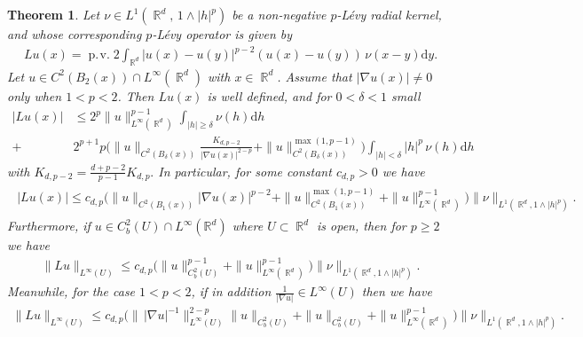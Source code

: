 \documentclass[10pt,a4paper]{amsart}
\newtheorem{theorem}{Theorem}
\DeclareMathOperator{\R}{\mathbb{R}}
\renewcommand{\d}{\mathrm{d}}
\DeclareMathOperator{\pv}{\operatorname{p.\!v.}}
\begin{document}
\begin{theorem}\label{thm:point-evalua-pLevy-rad}
Let $\nu \in L^1(\R^d,\, 1 \wedge |h|^p)$ be a non-negative $p$-L\'evy radial kernel, and whose corresponding $p$-L\'evy operator is given by
\begin{align*}
Lu(x)= \pv 2\int_{\R^d}|u(x)-u(y)|^{p-2}(u(x)-u(y))\, \nu(x-y)\d y.
\end{align*}
Let $u \in C^{2}(B_{2}(x)) \cap L^{\infty}(\R^d)$ with $x \in \R^d$. Assume that $|\nabla u(x)| \neq 0$ only when $1 < p < 2$.
Then $Lu(x)$ is well defined, and for  $0<\delta<1$ small
\begin{align*}
|Lu(x)|&\leq 2^p\|u\|^{p-1}_{L^\infty(\R^d)}\int_{|h|\geq \delta}\nu(h)\d h\\
+&2^{p+1}p\Big(\|u\|_{C^2(B_\delta(x))} \frac{K_{d,p-2}}{|\nabla u(x)|^{2-p}}+
\|u\|^{\max(1, p-1)}_{C^2(B_\delta(x))}\Big)\int_{|h|<\delta}|h|^p\, \nu(h)\d h
\end{align*}
with  $K_{d,p-2}= \tfrac{d+p-2}{p-1} K_{d,p}. $ In particular, for some constant $c_{d,p}>0$ we have
\begin{align*}
\begin{split}
|Lu(x)|\leq c_{d,p}\Big(\|u\|_{C^2(B_1(x))} |\nabla u(x)|^{p-2}+
\|u\|^{\max(1, p-1)}_{C^2(B_1(x))}+\|u\|^{p-1}_{L^\infty(\R^d)}\Big)
\|\nu\|_{L^1(\R^d,1\land|h|^p)}.
\end{split}
\end{align*}
Furthermore,  if $u \in C^{2}_b(U) \cap L^{\infty}(\mathbb{R}^d)$ where $U\subset  \R^d$ is open, then for $p\geq 2$ we have
\begin{align*}
\|Lu\|_{L^\infty(U)}\leq c_{d,p}\Big(\|u\|^{p-1}_{C^2_b(U)} + \|u\|^{p-1}_{L^\infty(\R^d)}\Big)\|\nu\|_{L^1(\R^d,1\land|h|^p)}.
\end{align*}
 Meanwhile, for the case $1<p<2$,  if in addition $\frac{1}{|\nabla u|}\in L^\infty(U)$  then  we have
\begin{align*}
\|Lu\|_{L^\infty(U)}\leq c_{d,p} \Big( \|\, |\nabla u|^{-1}\|^{2-p}_{L^\infty(U)}\|u\|_{C^2_b(U)}  +\|u\|_{C^2_b(U)}  + \|u\|^{p-1}_{L^\infty(\R^d)}\Big)\|\nu\|_{L^1(\R^d,1\land|h|^p)}.
\end{align*}
\end{theorem}
\end{document}
